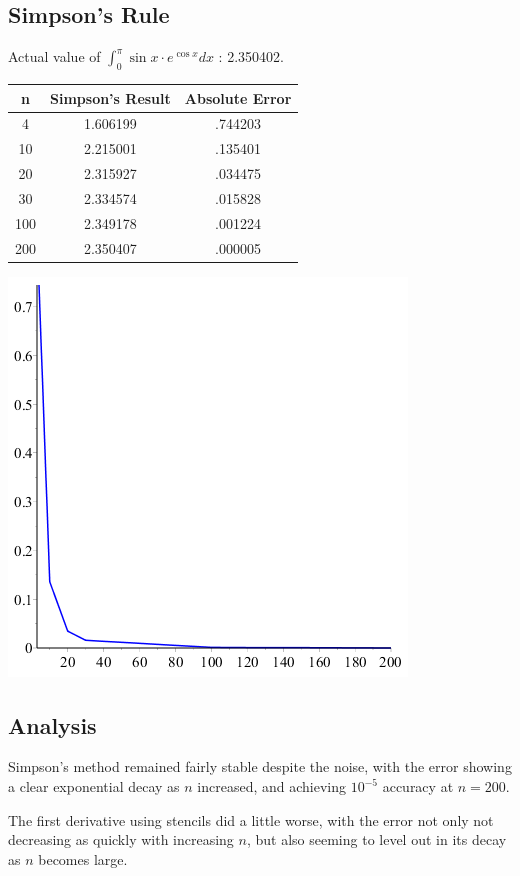 \documentclass[11pt,fleqn]{article} %
\begin{document}
\subsection*{Simpson's Rule}
Actual value of $\int_{0}^{\pi} \sin x \cdot e^{\cos x} dx$ : 2.350402.

\begin{tabular}{c | c | c }
n & Simpson's Result & Absolute Error \\
\hline
4 & 1.606199 & .744203 \\
10 & 2.215001 & .135401 \\
20 & 2.315927&  .034475\\
30 & 2.334574&  .015828\\
100 & 2.349178 & .001224 \\
200 & 2.350407 & .000005 \\
\end{tabular}

\includegraphics[scale=.5]{plots/problem2simpsonplot.png}
\subsection*{Analysis}
Simpson's method remained fairly stable despite the noise, with the error showing a clear exponential decay as $n$ increased,
and achieving $10^{-5}$ accuracy at $n=200$.

The first derivative using stencils did a little worse, with the error not only not decreasing as quickly with increasing $n$, but also seeming to level out in its decay as $n$ becomes large.
\end{document}
